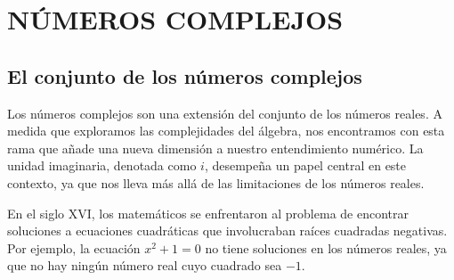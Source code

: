\chapter{NÚMEROS COMPLEJOS}\label{chap:numeros-complejos}
\printchaptertableofcontents

\section{El conjunto de los números complejos}

Los números complejos son una extensión del conjunto de los números reales. A medida que exploramos las complejidades del álgebra, nos encontramos con esta rama que añade una nueva dimensión a nuestro entendimiento numérico. La unidad imaginaria, denotada como $i$, desempeña un papel central en este contexto, ya que nos lleva más allá de las limitaciones de los números reales.

En el siglo XVI, los matemáticos se enfrentaron al problema de encontrar soluciones a ecuaciones cuadráticas que involucraban raíces cuadradas negativas. Por ejemplo, la ecuación \(x^2 + 1 = 0\) no tiene soluciones en los números reales, ya que no hay ningún número real cuyo cuadrado sea $-1$.

